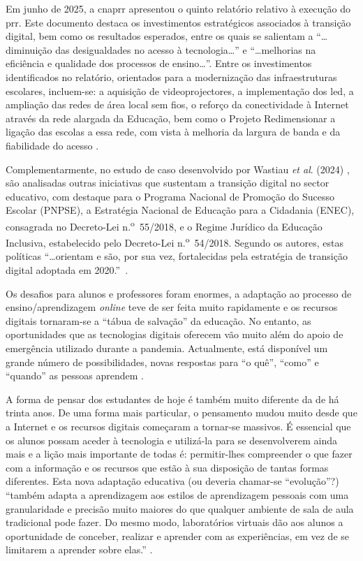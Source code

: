 Em junho de 2025, a \acrshort{cnaprr} apresentou o quinto relatório relativo à execução do \acrshort{prr}. Este documento destaca os investimentos estratégicos associados à transição digital, bem como os resultados esperados, entre os quais se salientam a ``\ldots diminuição das desigualdades no acesso à tecnologia\ldots '' e ``\ldots melhorias na eficiência e qualidade dos processos de ensino\ldots''. Entre os investimentos identificados no relatório, orientados para a modernização das infraestruturas escolares, incluem-se: a aquisição de videoprojectores, a implementação dos \acrfull{led}, a ampliação das redes de área local sem fios, o reforço da conectividade à Internet através da rede alargada da Educação, bem como o Projeto Redimensionar a ligação das escolas a essa rede, com vista à melhoria da largura de banda e da fiabilidade do acesso \cite{cnaprr2025}.

Complementarmente, no estudo de caso desenvolvido por Wastiau \textit{et al}. (2024) \cite{estrategiatransdigital}, são analisadas outras iniciativas que sustentam a transição digital no sector educativo, com destaque para o Programa Nacional de Promoção do Sucesso Escolar (PNPSE), a Estratégia Nacional de Educação para a Cidadania (ENEC), consagrada no Decreto-Lei n.\textsuperscript{o}~55/2018, e o Regime Jurídico da Educação Inclusiva, estabelecido pelo Decreto-Lei n.\textsuperscript{o}~54/2018. Segundo os autores, estas políticas ``\ldots orientam e são, por sua vez, fortalecidas pela estratégia de transição digital adoptada em 2020.''~\cite{estrategiatransdigital}.

Os desafios para alunos e professores foram enormes, a adaptação ao processo de ensino/aprendizagem \textit{online} teve de ser feita muito rapidamente e os recursos digitais tornaram-se a ``tábua de salvação'' da educação. No entanto, as oportunidades que as tecnologias digitais oferecem vão muito além do apoio de emergência utilizado durante a pandemia. Actualmente, está disponível um grande número de possibilidades, novas respostas para ``o quê'', ``como'' e ``quando'' as pessoas aprendem \cite{oecd_state_2021}.

A forma de pensar dos estudantes de hoje é também muito diferente da de há trinta anos. De uma forma mais particular, o pensamento mudou muito desde que a Internet e os recursos digitais começaram a tornar-se massivos. É essencial que os alunos possam aceder à tecnologia e utilizá-la para se desenvolverem ainda mais e a lição mais importante de todas é: permitir-lhes compreender o que fazer com a informação e os recursos que estão à sua disposição de tantas formas diferentes. Esta nova adaptação educativa (ou deveria chamar-se ``evolução''?) ``também adapta a aprendizagem aos estilos de aprendizagem pessoais com uma granularidade e precisão muito maiores do que qualquer ambiente de sala de aula tradicional pode fazer. Do mesmo modo, laboratórios virtuais dão aos alunos a oportunidade de conceber, realizar e aprender com as experiências, em vez de se limitarem a aprender sobre elas.'' \cite{oecd_state_2021}.

